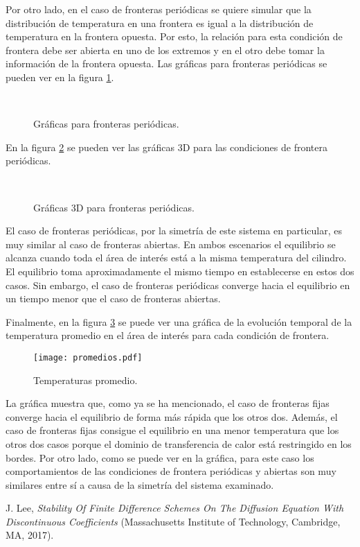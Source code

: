 \documentclass{article}
\begin{document}
Por otro lado, en el caso de fronteras periódicas se quiere simular que la distribución de temperatura en una frontera es igual a la distribución de temperatura en la frontera opuesta. Por esto, la relación para esta condición de frontera debe ser abierta en uno de los extremos y en el otro debe tomar la información de la frontera opuesta. Las gráficas para fronteras periódicas se pueden ver en la figura \ref{fig:periodicas}.
\begin{figure}[htbp]
\centering
     \\
    \caption{Gráficas para fronteras periódicas.}
    \label{fig:periodicas}
\end{figure}
En la figura \ref{fig:periodicas3D} se pueden ver las gráficas 3D para las condiciones de frontera periódicas.
\begin{figure}[htbp]
\centering
     \\
    \caption{Gráficas 3D para fronteras periódicas.}
    \label{fig:periodicas3D}
\end{figure}
El caso de fronteras periódicas, por la simetría de este sistema en particular, es muy similar al caso de fronteras abiertas. En ambos escenarios el equilibrio se alcanza cuando toda el área de interés está a la misma temperatura del cilindro. El equilibrio toma aproximadamente el mismo tiempo en establecerse en estos dos casos. Sin embargo, el caso de fronteras periódicas converge hacia el equilibrio en un tiempo menor que el caso de fronteras abiertas.

Finalmente, en la figura \ref{fig:promedios} se puede ver una gráfica de la evolución temporal de la temperatura promedio en el área de interés para cada condición de frontera.
\begin{figure}[htbp]
	\centering
	\texttt{[image: promedios.pdf]}
	\caption{Temperaturas promedio.}
	\label{fig:promedios}
\end{figure}
La gráfica muestra que, como ya se ha mencionado, el caso de fronteras fijas converge hacia el equilibrio de forma más rápida que los otros dos. Además, el caso de fronteras fijas consigue el equilibrio en una menor temperatura que los otros dos casos porque el dominio de transferencia de calor está restringido en los bordes. Por otro lado, como se puede ver en la gráfica, para este caso los comportamientos de las condiciones de frontera periódicas y abiertas son muy similares entre sí a causa de la simetría del sistema examinado.

\begin{thebibliography}{}
J. Lee, \textit{Stability Of Finite Difference Schemes On The Diffusion Equation With Discontinuous Coefficients} (Massachusetts Institute of Technology, Cambridge, MA, 2017).

\end{thebibliography}
\end{document}
